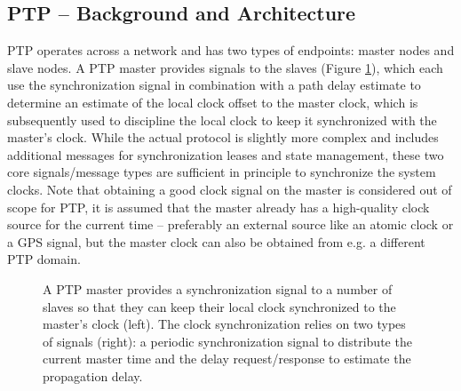 \subsection{PTP -- Background and Architecture}

PTP operates across a network and has two types of endpoints: master nodes and slave nodes. A PTP master provides signals to the slaves (Figure \ref{fig:ptp-architecture}), which each use the synchronization signal in combination with a path delay estimate to determine an estimate of the local clock offset to the master clock, which is subsequently used to discipline the local clock to keep it synchronized with the master's clock. While the actual protocol is slightly more complex and includes additional messages for synchronization leases and state management, these two core signals/message types are sufficient in principle to synchronize the system clocks. Note that obtaining a good clock signal on the master is considered out of scope for PTP, it is assumed that the master already has a high-quality clock source for the current time -- preferably an external source like an atomic clock or a GPS signal, but the master clock can also be obtained from e.g. a different PTP domain.

\begin{figure}
    \caption{
        A PTP master provides a synchronization signal to a number of slaves so that they can keep their local clock synchronized to the master's clock (left). The clock synchronization relies on two types of signals (right): a periodic synchronization signal to distribute the current master time and the delay request/response to estimate the propagation delay.
    }
    \label{fig:ptp-architecture}
\end{figure}

